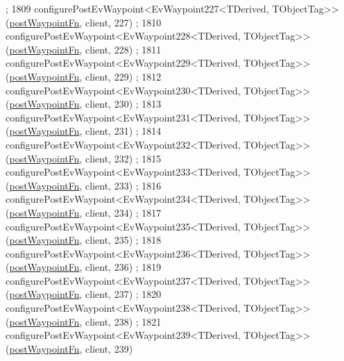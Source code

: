 \begin{DoxyCode}
      ;
1809     configurePostEvWaypoint<EvWaypoint227<TDerived, TObjectTag>>(\hyperlink{classmove__base__z__client_1_1WaypointEventDispatcher_acc538eb7506c13f7cca2268a1742dadd}{postWaypointFn}, client, 227)
      ;
1810     configurePostEvWaypoint<EvWaypoint228<TDerived, TObjectTag>>(\hyperlink{classmove__base__z__client_1_1WaypointEventDispatcher_acc538eb7506c13f7cca2268a1742dadd}{postWaypointFn}, client, 228)
      ;
1811     configurePostEvWaypoint<EvWaypoint229<TDerived, TObjectTag>>(\hyperlink{classmove__base__z__client_1_1WaypointEventDispatcher_acc538eb7506c13f7cca2268a1742dadd}{postWaypointFn}, client, 229)
      ;
1812     configurePostEvWaypoint<EvWaypoint230<TDerived, TObjectTag>>(\hyperlink{classmove__base__z__client_1_1WaypointEventDispatcher_acc538eb7506c13f7cca2268a1742dadd}{postWaypointFn}, client, 230)
      ;
1813     configurePostEvWaypoint<EvWaypoint231<TDerived, TObjectTag>>(\hyperlink{classmove__base__z__client_1_1WaypointEventDispatcher_acc538eb7506c13f7cca2268a1742dadd}{postWaypointFn}, client, 231)
      ;
1814     configurePostEvWaypoint<EvWaypoint232<TDerived, TObjectTag>>(\hyperlink{classmove__base__z__client_1_1WaypointEventDispatcher_acc538eb7506c13f7cca2268a1742dadd}{postWaypointFn}, client, 232)
      ;
1815     configurePostEvWaypoint<EvWaypoint233<TDerived, TObjectTag>>(\hyperlink{classmove__base__z__client_1_1WaypointEventDispatcher_acc538eb7506c13f7cca2268a1742dadd}{postWaypointFn}, client, 233)
      ;
1816     configurePostEvWaypoint<EvWaypoint234<TDerived, TObjectTag>>(\hyperlink{classmove__base__z__client_1_1WaypointEventDispatcher_acc538eb7506c13f7cca2268a1742dadd}{postWaypointFn}, client, 234)
      ;
1817     configurePostEvWaypoint<EvWaypoint235<TDerived, TObjectTag>>(\hyperlink{classmove__base__z__client_1_1WaypointEventDispatcher_acc538eb7506c13f7cca2268a1742dadd}{postWaypointFn}, client, 235)
      ;
1818     configurePostEvWaypoint<EvWaypoint236<TDerived, TObjectTag>>(\hyperlink{classmove__base__z__client_1_1WaypointEventDispatcher_acc538eb7506c13f7cca2268a1742dadd}{postWaypointFn}, client, 236)
      ;
1819     configurePostEvWaypoint<EvWaypoint237<TDerived, TObjectTag>>(\hyperlink{classmove__base__z__client_1_1WaypointEventDispatcher_acc538eb7506c13f7cca2268a1742dadd}{postWaypointFn}, client, 237)
      ;
1820     configurePostEvWaypoint<EvWaypoint238<TDerived, TObjectTag>>(\hyperlink{classmove__base__z__client_1_1WaypointEventDispatcher_acc538eb7506c13f7cca2268a1742dadd}{postWaypointFn}, client, 238)
      ;
1821     configurePostEvWaypoint<EvWaypoint239<TDerived, TObjectTag>>(\hyperlink{classmove__base__z__client_1_1WaypointEventDispatcher_acc538eb7506c13f7cca2268a1742dadd}{postWaypointFn}, client, 239)

\end{DoxyCode}
